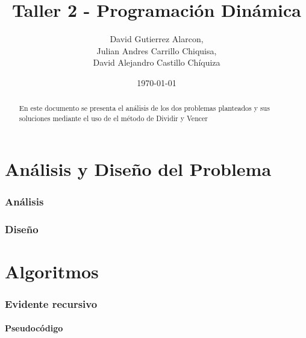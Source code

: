 \documentclass[]{article}
\numberwithin{equation}{section}
\numberwithin{figure}{section}
\theoremstyle{definition}
\begin{document}
\title{Taller 2 - Programación Dinámica}
\author{%
David Gutierrez Alarcon,\\ Julian Andres Carrillo Chiquisa,\\ David Alejandro Castillo Chíquiza}
\date{%
\today}
\maketitle

\begin{abstract}
En este documento se presenta el análisis de los dos problemas planteados y sus soluciones mediante el uso de el método de Dividir y Vencer
\end{abstract}

\part*{Análisis y Diseño del Problema}

\section*{Análisis}


\section*{Diseño}


\part*{Algoritmos}


\section*{Evidente recursivo}
	
	\subsection*{Pseudocódigo}
	
\end{document}
